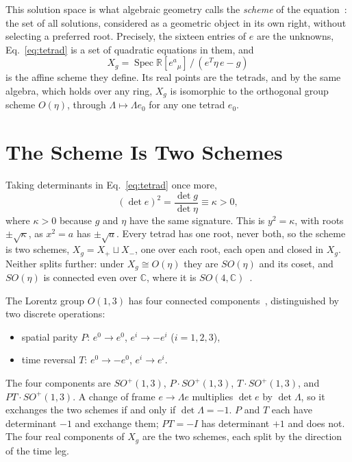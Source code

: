 \documentclass[twocolumn]{iopjournal}
\begin{document}
This solution space is what algebraic geometry calls the \emph{scheme} of the equation~\cite{Grothendieck1960,Hartshorne1977}: the set of all solutions, considered as a geometric object in its own right, without selecting a preferred root. Precisely, the sixteen entries of $e$ are the unknowns, Eq.~\eqref{eq:tetrad} is a set of quadratic equations in them, and
\[
X_g = \operatorname{Spec} \mathbb{R}[e^a{}_\mu] \,/\, (e^T \eta\, e - g)
\]
is the affine scheme they define. Its real points are the tetrads, and by the same algebra, which holds over any ring, $X_g$ is isomorphic to the orthogonal group scheme $O(\eta)$, through $\Lambda \mapsto \Lambda e_0$ for any one tetrad $e_0$.


\section*{The Scheme Is Two Schemes}

Taking determinants in Eq.~\eqref{eq:tetrad} once more,
\begin{equation}
(\det e)^2 = \frac{\det g}{\det \eta} \equiv \kappa > 0,
\label{eq:roots}
\end{equation}
where $\kappa > 0$ because $g$ and $\eta$ have the same signature. This is $y^2 = \kappa$, with roots $\pm\sqrt{\kappa}$, as $x^2 = a$ has $\pm\sqrt{a}$. Every tetrad has one root, never both, so the scheme is two schemes, $X_g = X_+ \sqcup X_-$, one over each root, each open and closed in $X_g$. Neither splits further: under $X_g \cong O(\eta)$ they are $SO(\eta)$ and its coset, and $SO(\eta)$ is connected even over $\mathbb{C}$, where it is $SO(4, \mathbb{C})$~\cite{Borel1991}.

The Lorentz group $O(1,3)$ has four connected components~\cite{Wald1984}, distinguished by two discrete operations:
\begin{itemize}
\item spatial parity $P$: $e^0 \to e^0$, $e^i \to -e^i$ ($i = 1,2,3$),
\item time reversal $T$: $e^0 \to -e^0$, $e^i \to e^i$.
\end{itemize}
The four components are $SO^+(1,3)$, $P \cdot SO^+(1,3)$, $T \cdot SO^+(1,3)$, and $PT \cdot SO^+(1,3)$. A change of frame $e \to \Lambda e$ multiplies $\det e$ by $\det \Lambda$, so it exchanges the two schemes if and only if $\det \Lambda = -1$. $P$ and $T$ each have determinant $-1$ and exchange them; $PT = -I$ has determinant $+1$ and does not. The four real components of $X_g$ are the two schemes, each split by the direction of the time leg.
\end{document}
